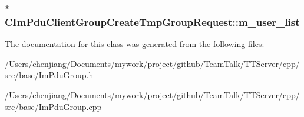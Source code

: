 \subsubsection[{m\+\_\+user\+\_\+list}]{$\ast$ C\+Im\+Pdu\+Client\+Group\+Create\+Tmp\+Group\+Request\+::m\+\_\+user\+\_\+list\hspace{0.3cm}{\ttfamily [private]}}\label{class_c_im_pdu_client_group_create_tmp_group_request_af523d0ff54157c1f45d8876e958c2f6f}


The documentation for this class was generated from the following files\+:\begin{DoxyCompactItemize}
\item 
/\+Users/chenjiang/\+Documents/mywork/project/github/\+Team\+Talk/\+T\+T\+Server/cpp/src/base/\hyperlink{_im_pdu_group_8h}{Im\+Pdu\+Group.\+h}\item 
/\+Users/chenjiang/\+Documents/mywork/project/github/\+Team\+Talk/\+T\+T\+Server/cpp/src/base/\hyperlink{_im_pdu_group_8cpp}{Im\+Pdu\+Group.\+cpp}\end{DoxyCompactItemize}
